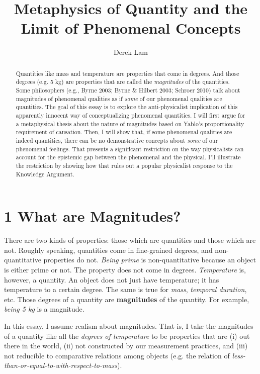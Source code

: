 \documentclass[a4paper,12pt]{article}
\title{\textbf{Metaphysics of Quantity and the Limit of Phenomenal Concepts}}
\author{Derek Lam}
\begin{document}
\maketitle

\begin{abstract}
Quantities like mass and temperature are properties that come in degrees. And those degrees (e.g. 5 kg) are properties that are called the \emph{magnitudes} of the quantities. Some philosophers (e.g., Byrne 2003; Byrne \& Hilbert 2003; Schroer 2010) talk about magnitudes of phenomenal qualities as if \emph{some} of our phenomenal qualities are quantities. The goal of this essay is to explore the anti-physicalist implication of this apparently innocent way of conceptualizing phenomenal quantities. I will first argue for a metaphysical thesis about the nature of magnitudes based on Yablo's proportionality requirement of causation. Then, I will show that, if some phenomenal qualities are indeed quantities, there can be no demonstrative concepts about \emph{some} of our phenomenal feelings. That presents a significant restriction on the way physicalists can account for the epistemic gap between the phenomenal and the physical. I'll illustrate the restriction by showing how that rules out a popular physicalist response to the Knowledge Argument.
\end{abstract}

\section*{1 What are Magnitudes?}

There are two kinds of properties: those which are quantities and those which are not. Roughly speaking, quantities come in fine-grained degrees, and non-quantitative properties do not. \emph{Being prime} is non-quantitative because an object is either prime or not. The property does not come in degrees. \emph{Temperature} is, however, a quantity. An object does not just have temperature; it has temperature to a certain degree. The same is true for \emph{mass}, \emph{temporal duration}, etc. Those degrees of a quantity are \textbf{magnitudes} of the quantity. For example, \emph{being 5 kg} is a magnitude.

In this essay, I assume realism about magnitudes. That is, I take the magnitudes of a quantity like all the \emph{degrees of temperature} to be properties that are (i) out there in the world, (ii) not constructed by our measurement practices, and (iii) not reducible to comparative relations among objects (e.g. the relation of \emph{less-than-or-equal-to-with-respect-to-mass}).\footnotemark
\end{document}
